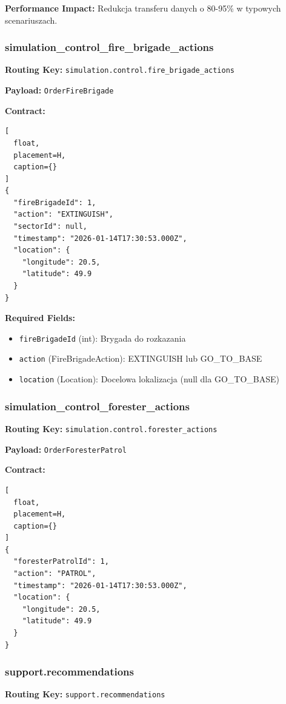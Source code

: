 \documentclass[11pt,a4paper] {article}
\begin{document}
\textbf{Performance Impact:} Redukcja transferu danych o 80-95\% w typowych scenariuszach.

\subsubsection{simulation\_control\_fire\_brigade\_actions}

\textbf{Routing Key:} \texttt{simulation.control.fire\_brigade\_actions}

\textbf{Payload:} \texttt{OrderFireBrigade}

\textbf{Contract:}
\begin{lstlisting}[
  float,
  placement=H,
  caption={}
] 
{
  "fireBrigadeId": 1,
  "action": "EXTINGUISH",
  "sectorId": null,
  "timestamp": "2026-01-14T17:30:53.000Z",
  "location": {
    "longitude": 20.5,
    "latitude": 49.9
  }
}
\end{lstlisting}

\textbf{Required Fields:}
\begin{itemize}
    \item \texttt{fireBrigadeId} (int): Brygada do rozkazania
    \item \texttt{action} (FireBrigadeAction): EXTINGUISH lub GO\_TO\_BASE
    \item \texttt{location} (Location): Docelowa lokalizacja (null dla GO\_TO\_BASE)
\end{itemize}

\subsubsection{simulation\_control\_forester\_actions}

\textbf{Routing Key:} \texttt{simulation.control.forester\_actions}

\textbf{Payload:} \texttt{OrderForesterPatrol}

\textbf{Contract:}
\begin{lstlisting}[
  float,
  placement=H,
  caption={}
] 
{
  "foresterPatrolId": 1,
  "action": "PATROL",
  "timestamp": "2026-01-14T17:30:53.000Z",
  "location": {
    "longitude": 20.5,
    "latitude": 49.9
  }
}
\end{lstlisting}

\subsubsection{support.recommendations}

\textbf{Routing Key:} \texttt{support.recommendations}
\end{document}
